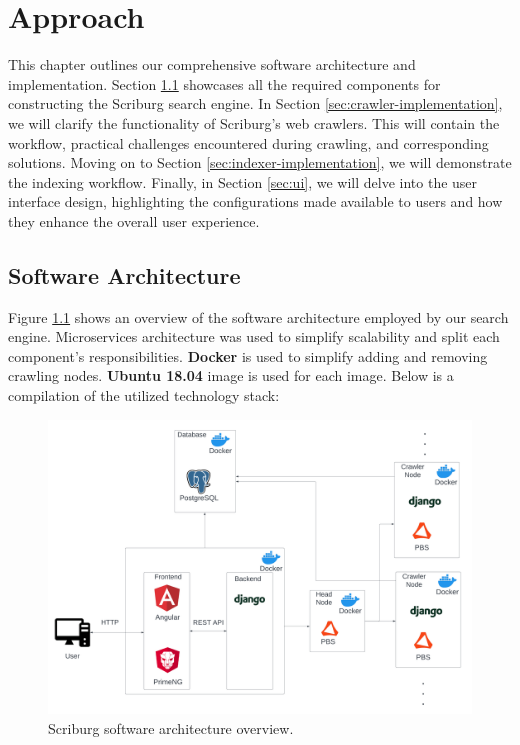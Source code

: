 \chapter{Approach}
\label{chap:approach}
This chapter outlines our comprehensive software architecture and implementation. Section \ref{sec:software-arch} showcases all the required components for constructing the Scriburg search engine. In Section \ref{sec:crawler-implementation}, we will clarify the functionality of Scriburg's web crawlers. This will contain the workflow, practical challenges encountered during crawling, and corresponding solutions. Moving on to Section \ref{sec:indexer-implementation}, we will demonstrate the indexing workflow. Finally, in Section \ref{sec:ui}, we will delve into the user interface design, highlighting the configurations made available to users and how they enhance the overall user experience.

\section{Software Architecture}\label{sec:software-arch}

Figure \ref{fig:software-arch} shows an overview of the software architecture employed by our search engine. Microservices architecture was used to simplify scalability and split each component's responsibilities. \textbf{Docker} is used to simplify adding and removing crawling nodes. \textbf{Ubuntu 18.04} image is used for each image. Below is a compilation of the utilized technology stack:

\begin{figure}[h]	
     \centering
     \includegraphics[width=13cm]{figures/software_arch.png}
     \caption{Scriburg software architecture overview.}
     \label{fig:software-arch}
\end{figure}

